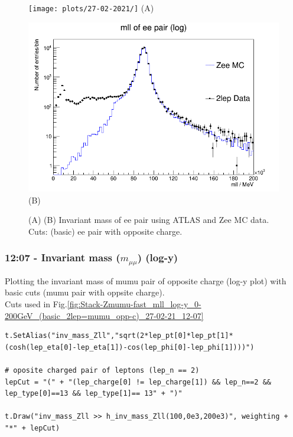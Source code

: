 \begin{figure}[h!]
    \centering
    \begin{minipage}{0.5\textwidth}
        \centering
        \texttt{[image: plots/27-02-2021/]}
        (A)
    \end{minipage}\hfill
    \begin{minipage}{0.5\textwidth}
        \centering
        \includegraphics[width=\linewidth]{plots/27-02-2021/2-Stack-Zee-fast_mll_log-y_0-200GeV_(basic_2lep=ee_opp-c)_27-02-21_12-05.png}
        (B)
    \end{minipage}
    \caption{(A)  (B) Invariant mass of ee pair using ATLAS and Zee MC data.  Cuts: (basic) ee pair with opposite charge.}
    \label{fig:Stack-Zee-fast_mll_log-y_0-200GeV_(basic_2lep=ee_opp-c)_27-02-21_12-05}
\end{figure}

\subsubsection*{12:07 - Invariant mass ($m_{\mu\mu}$) (log-y)}
Plotting the invariant mass of mumu pair of opposite charge (log-y plot) with basic cuts (mumu pair with oppsite charge).
\\
Cuts used in Fig.\ref{fig:Stack-Zmumu-fast_mll_log-y_0-200GeV_(basic_2lep=mumu_opp-c)_27-02-21_12-07}
\begin{lstlisting}
t.SetAlias("inv_mass_Zll","sqrt(2*lep_pt[0]*lep_pt[1]*(cosh(lep_eta[0]-lep_eta[1])-cos(lep_phi[0]-lep_phi[1])))")

# oposite charged pair of leptons (lep_n == 2)
lepCut = "(" + "(lep_charge[0] != lep_charge[1]) && lep_n==2 && lep_type[0]==13 && lep_type[1]== 13" + ")"
    
t.Draw("inv_mass_Zll >> h_inv_mass_Zll(100,0e3,200e3)", weighting + "*" + lepCut) 
\end{lstlisting}

